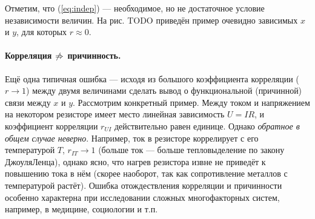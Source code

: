 Отметим, что (\ref{eq:indep}) --- необходимое,
но не достаточное условие независимости величин. На рис. TODO приведён
пример очевидно зависимых $x$ и $y$, для которых $r\approx0$.

\paragraph{Корреляция $\protect\not\Rightarrow$ причинность.}

Ещё одна типичная ошибка --- исходя из большого
коэффициента корреляции ($r\to1$) между двумя величинами сделать
вывод о функциональной (причинной) связи между $x$ и $y$. Рассмотрим
конкретный пример. Между током и напряжением на некотором резисторе
имеет место линейная зависимость $U=IR$, и коэффициент корреляции
$r_{UI}$ действительно равен единице. Однако \emph{обратное
в общем случае неверно}. Например, ток в резисторе коррелирует
с его температурой $T$, $r_{IT}\to1$ (больше ток --- больше
тепловыделение по закону Джоуля\textendash Ленца), однако ясно, что
нагрев резистора извне не приведёт к повышению тока в нём (скорее
наоборот, так как сопротивление металлов с температурой растёт). Ошибка
отождествления корреляции и причинности особенно характерна при исследовании
сложных многофакторных систем, например, в медицине, социологии и
т.п.


